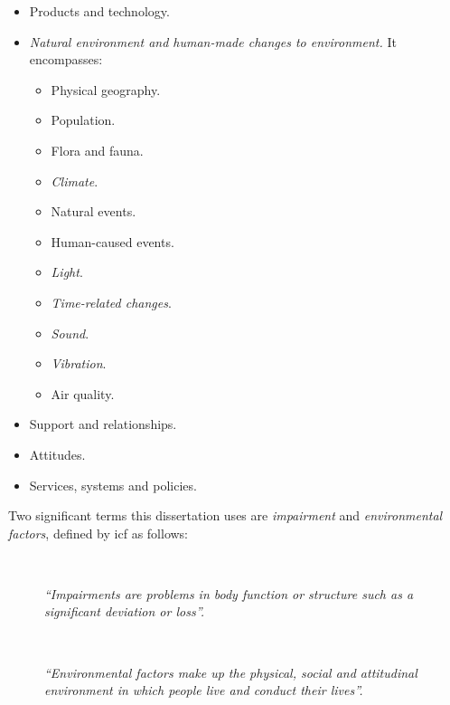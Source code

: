 \begin{itemize}
  \item Products and technology.
  \item \textit{Natural environment and human-made changes to environment.} It 
  encompasses:
  \begin{multicols}{2}
    \begin{itemize}
      \item Physical geography.
      \item Population.
      \item Flora and fauna.
      \item \textit{Climate}.
      \item Natural events.
      \item Human-caused events.
      \item \textit{Light}.
      \item \textit{Time-related changes}.
      \item \textit{Sound}.
      \item \textit{Vibration}.
      \item Air quality.
    \end{itemize}
  \end{multicols}

  \item Support and relationships.
  \item Attitudes.
  \item Services, systems and policies.
\end{itemize}

Two significant terms this dissertation uses are \textit{impairment} and 
\textit{environmental factors}, defined by \ac{icf} as follows:

\begin{description}
  \item[] \hfill \\
    \begin{mdframed}[hidealllines=true,backgroundcolor=gray!20]
    \textit{``Impairments are problems in body function or structure such as a 
    significant deviation or loss''.}
    \end{mdframed} 
    
  \item[] \hfill \\
    \begin{mdframed}[hidealllines=true,backgroundcolor=gray!20]
    \textit{``Environmental factors make up the physical, social and attitudinal
    environment in which people live and conduct their lives''.}
    \end{mdframed} 
\end{description}


